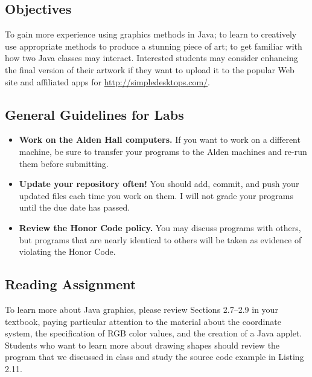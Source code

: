 



\subsection*{Objectives}
\vspace{-0.05in}

To gain more experience using graphics methods in Java; to learn to creatively use appropriate methods to produce a
stunning piece of art; to get familiar with how two Java classes may interact. Interested students may consider
enhancing the final version of their artwork if they want to upload it to the popular Web site and affiliated apps for
\url{http://simpledesktops.com/}.

\vspace{-0.1in}
\subsection*{General Guidelines for Labs}
\vspace{-0.05in}
\begin{itemize}
\item
{\bf Work on the Alden Hall computers.} If you want to work on a different
machine, be sure to transfer your programs to the Alden
machines and re-run them before submitting.
\item
{\bf Update your repository often!} You should add, commit,
and push your updated files each time you work on them.  I will not grade
your programs until the due date has passed.
\item
{\bf Review the Honor Code policy.} You
may discuss programs with others, but programs that are nearly identical
to others will be taken as evidence of violating the Honor Code.
\end{itemize}

\vspace{-0.15in}
\subsection*{Reading Assignment}
\vspace{-0.05in}

To learn more about Java graphics, please review Sections 2.7--2.9 in your textbook, paying particular attention to the
material about the coordinate system, the specification of RGB color values, and the creation of a Java applet. Students
who want to learn more about drawing shapes should review the program that we discussed in class and study the source
code example in Listing 2.11.

